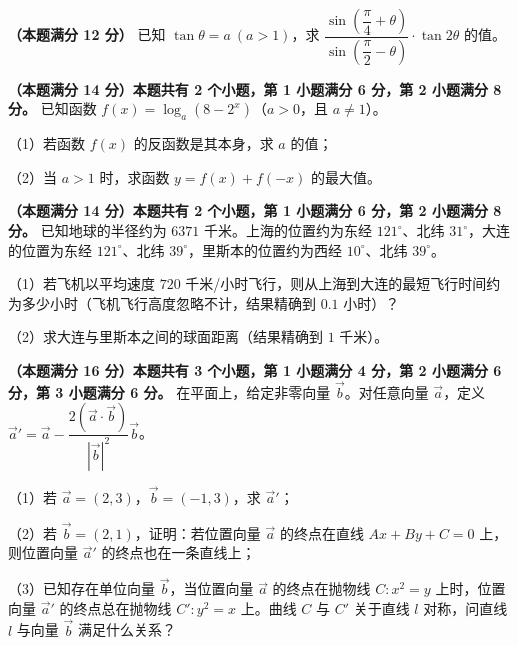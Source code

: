 \begin{question}
\textbf{（本题满分 12 分）} 已知 $\tan\theta=a\ (a>1)$，求 $\dfrac{\sin\left(\dfrac\pi4+\theta\right)}{\sin\left(\dfrac\pi2-\theta\right)}\cdot\tan2\theta$ 的值。

\end{question}
\begin{question}
\textbf{（本题满分 14 分）本题共有 2 个小题，第 1 小题满分 6 分，第 2 小题满分 8 分。} 已知函数 $f(x)=\log_a(8-2^x)$（$a>0$，且 $a\neq1$）。

（1）若函数 $f(x)$ 的反函数是其本身，求 $a$ 的值；

（2）当 $a>1$ 时，求函数 $y=f(x)+f(-x)$ 的最大值。

\Needspace{0.4\textheight}
\end{question}
\begingroup
\renewenvironment{question}{\Needspace{0.5\textheight}}{}
\begin{question}
\textbf{（本题满分 14 分）本题共有 2 个小题，第 1 小题满分 6 分，第 2 小题满分 8 分。} 已知地球的半径约为 $6371$ 千米。上海的位置约为东经 $121^\circ$、北纬 $31^\circ$，大连的位置为东经 $121^\circ$、北纬 $39^\circ$，里斯本的位置约为西经 $10^\circ$、北纬 $39^\circ$。

（1）若飞机以平均速度 $720$ 千米/小时飞行，则从上海到大连的最短飞行时间约为多少小时（飞机飞行高度忽略不计，结果精确到 $0.1$ 小时）？

（2）求大连与里斯本之间的球面距离（结果精确到 $1$ 千米）。
\nopagebreak[4]
\begin{center}\end{center}
\nopagebreak[4]
\end{question}
\endgroup
\begin{question}
\textbf{（本题满分 16 分）本题共有 3 个小题，第 1 小题满分 4 分，第 2 小题满分 6 分，第 3 小题满分 6 分。} 在平面上，给定非零向量 $\vec b$。对任意向量 $\vec a$，定义 $\vec a'=\vec a-\dfrac{2\left(\vec a\cdot\vec b\right)}{\left|\vec b\right|^2}\vec b$。

（1）若 $\vec a=(2,3)$，$\vec b=(-1,3)$，求 $\vec a'$；

（2）若 $\vec b=(2,1)$，证明：若位置向量 $\vec a$ 的终点在直线 $Ax+By+C=0$ 上，则位置向量 $\vec a'$ 的终点也在一条直线上；

（3）已知存在单位向量 $\vec b$，当位置向量 $\vec a$ 的终点在抛物线 $C:x^2=y$ 上时，位置向量 $\vec a'$ 的终点总在抛物线 $C':y^2=x$ 上。曲线 $C$ 与 $C'$ 关于直线 $l$ 对称，问直线 $l$ 与向量 $\vec b$ 满足什么关系？

\end{question}
